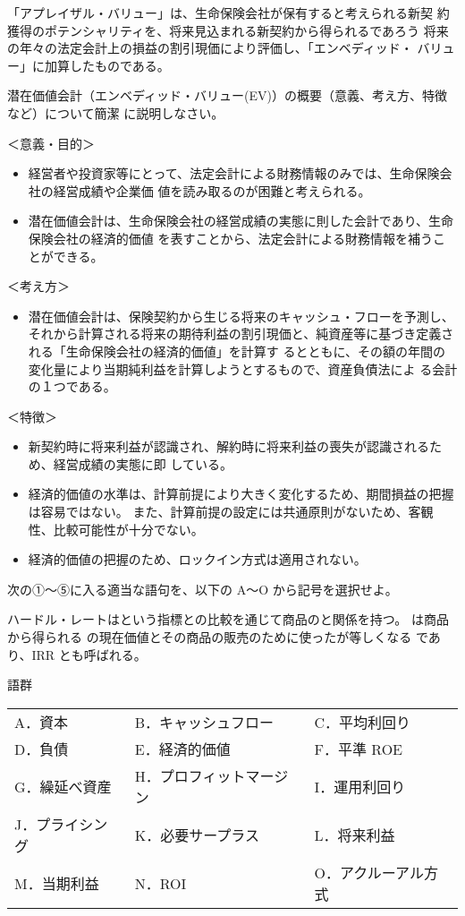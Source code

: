 \documentclass[report,gutter=10mm,fore-edge=10mm,uplatex,dvipdfmx]{jlreq}
\begin{document}
「アプレイザル・バリュー」は、生命保険会社が保有すると考えられる新契
約獲得のポテンシャリティを、将来見込まれる新契約から得られるであろう
将来の年々の法定会計上の損益の割引現価により評価し、「エンベディッド・
バリュー」に加算したものである。

潜在価値会計（エンベディッド・バリュー(EV)）の概要（意義、考え方、特徴など）について簡潔
に説明しなさい。

\answer{}
＜意義・目的＞
\begin{itemize}
 \item[] 経営者や投資家等にとって、法定会計による財務情報のみでは、生命保険会社の経営成績や企業価 値を読み取るのが困難と考えられる。
 \item[] 潜在価値会計は、生命保険会社の経営成績の実態に則した会計であり、生命保険会社の経済的価値 を表すことから、法定会計による財務情報を補うことができる。
\end{itemize}
＜考え方＞
\begin{itemize}
 \item[] 潜在価値会計は、保険契約から生じる将来のキャッシュ・フローを予測し、それから計算される将来の期待利益の割引現価と、純資産等に基づき定義される「生命保険会社の経済的価値」を計算す
 るとともに、その額の年間の変化量により当期純利益を計算しようとするもので、資産負債法によ
 る会計の１つである。
\end{itemize}
＜特徴＞
\begin{itemize}
 \item[] 新契約時に将来利益が認識され、解約時に将来利益の喪失が認識されるため、経営成績の実態に即 している。
 \item[] 経済的価値の水準は、計算前提により大きく変化するため、期間損益の把握は容易ではない。
また、計算前提の設定には共通原則がないため、客観性、比較可能性が十分でない。
 \item[] 経済的価値の把握のため、ロックイン方式は適用されない。
\end{itemize}

次の①～⑤に入る適当な語句を、以下の A～O から記号を選択せよ。

ハードル・レートはという指標との比較を通じて商品のと関係を持つ。
は商品から得られる
の現在価値とその商品の販売のために使ったが等しくなる
であり、IRR とも呼ばれる。

語群
\begin{tabular}{lll}
A．資本 & B．キャッシュフロー& C．平均利回り\\
D．負債 &E．経済的価値 & F．平準 ROE\\
G．繰延べ資産 & H．プロフィットマージン&  I．運用利回り\\
J．プライシング & K．必要サープラス&L．将来利益 \\
M．当期利益 &N．ROI &O．アクルーアル方式 \\
\end{tabular}
\end{document}
